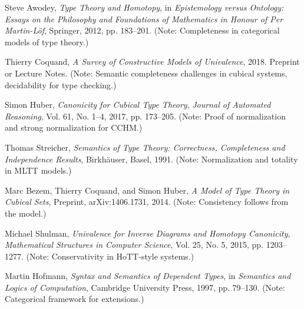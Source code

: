 \documentclass{article}
\theoremstyle{definition}
\begin{document}
\begin{thebibliography}{99}
Steve Awodey,
\textit{Type Theory and Homotopy},
in \textit{Epistemology versus Ontology: Essays on the Philosophy and Foundations of Mathematics in Honour of Per Martin-Löf},
Springer, 2012, pp. 183--201.
(Note: Completeness in categorical models of type theory.)

Thierry Coquand,
\textit{A Survey of Constructive Models of Univalence},
2018.
Preprint or Lecture Notes.
(Note: Semantic completeness challenges in cubical systems, decidability for type checking.)

Simon Huber,
\textit{Canonicity for Cubical Type Theory},
\textit{Journal of Automated Reasoning},
Vol. 61, No. 1--4, 2017, pp. 173--205.
(Note: Proof of normalization and strong normalization for CCHM.)

Thomas Streicher,
\textit{Semantics of Type Theory: Correctness, Completeness and Independence Results},
Birkhäuser, Basel, 1991.
(Note: Normalization and totality in MLTT models.)

Marc Bezem, Thierry Coquand, and Simon Huber,
\textit{A Model of Type Theory in Cubical Sets},
Preprint, arXiv:1406.1731, 2014.
(Note: Consistency follows from the model.)

Michael Shulman,
\textit{Univalence for Inverse Diagrams and Homotopy Canonicity},
\textit{Mathematical Structures in Computer Science},
Vol. 25, No. 5, 2015, pp. 1203--1277.
(Note: Conservativity in HoTT-style systems.)

Martin Hofmann,
\textit{Syntax and Semantics of Dependent Types},
in \textit{Semantics and Logics of Computation},
Cambridge University Press, 1997, pp. 79--130.
(Note: Categorical framework for extensions.)

\end{thebibliography}
\end{document}

